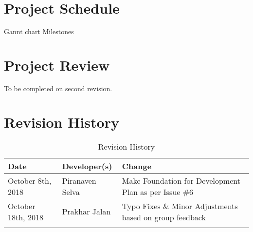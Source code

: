 \documentclass{article}
\begin{document}
\section{Project Schedule}

Gannt chart \newline
Milestones \newline


\section{Project Review}

To be completed on second revision. 

\newpage
\section{Revision History}
\begin{table}[hp]
\caption{Revision History} \label{TblRevisionHistory}
\begin{tabularx}{\textwidth}{llX}
\toprule
\textbf{Date} & \textbf{Developer(s)} & \textbf{Change}\\
\midrule
October 8th, 2018 &Piranaven Selva & Make Foundation for Development Plan as per Issue \#6 \\
October 18th, 2018 &Prakhar Jalan & Typo Fixes \& Minor Adjustments based on group feedback \\
\\
\bottomrule
\end{tabularx}
\end{table}
\end{document}
